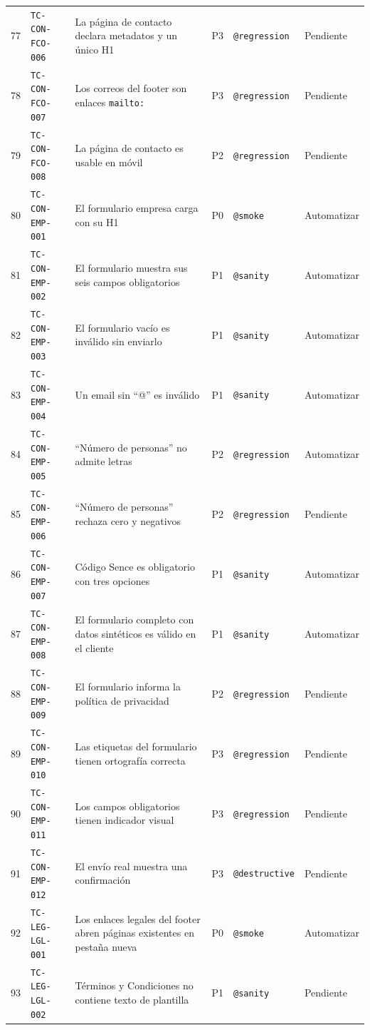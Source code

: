\documentclass[11pt,a4paper]{article}
\newcommand{\tcid}[1]{\texttt{#1}}
\begin{document}
{\begin{xltabular}{\textwidth}{@{}r l X c l l@{}}
77 & \tcid{TC-CON-FCO-006} & La página de contacto declara metadatos y un único H1 & P3 & \texttt{@regression} & Pendiente \\
78 & \tcid{TC-CON-FCO-007} & Los correos del footer son enlaces \texttt{mailto:} & P3 & \texttt{@regression} & Pendiente \\
79 & \tcid{TC-CON-FCO-008} & La página de contacto es usable en móvil & P2 & \texttt{@regression} & Pendiente \\
80 & \tcid{TC-CON-EMP-001} & El formulario empresa carga con su H1 & P0 & \texttt{@smoke} & Automatizar \\
81 & \tcid{TC-CON-EMP-002} & El formulario muestra sus seis campos obligatorios & P1 & \texttt{@sanity} & Automatizar \\
82 & \tcid{TC-CON-EMP-003} & El formulario vacío es inválido sin enviarlo & P1 & \texttt{@sanity} & Automatizar \\
83 & \tcid{TC-CON-EMP-004} & Un email sin ``@'' es inválido & P1 & \texttt{@sanity} & Automatizar \\
84 & \tcid{TC-CON-EMP-005} & ``Número de personas'' no admite letras & P2 & \texttt{@regression} & Automatizar \\
85 & \tcid{TC-CON-EMP-006} & ``Número de personas'' rechaza cero y negativos & P2 & \texttt{@regression} & Pendiente \\
86 & \tcid{TC-CON-EMP-007} & Código Sence es obligatorio con tres opciones & P1 & \texttt{@sanity} & Automatizar \\
87 & \tcid{TC-CON-EMP-008} & El formulario completo con datos sintéticos es válido en el cliente & P1 & \texttt{@sanity} & Automatizar \\
88 & \tcid{TC-CON-EMP-009} & El formulario informa la política de privacidad & P2 & \texttt{@regression} & Pendiente \\
89 & \tcid{TC-CON-EMP-010} & Las etiquetas del formulario tienen ortografía correcta & P3 & \texttt{@regression} & Pendiente \\
90 & \tcid{TC-CON-EMP-011} & Los campos obligatorios tienen indicador visual & P3 & \texttt{@regression} & Pendiente \\
91 & \tcid{TC-CON-EMP-012} & El envío real muestra una confirmación & P3 & \texttt{@destructive} & Pendiente \\
92 & \tcid{TC-LEG-LGL-001} & Los enlaces legales del footer abren páginas existentes en pestaña nueva & P0 & \texttt{@smoke} & Automatizar \\
93 & \tcid{TC-LEG-LGL-002} & Términos y Condiciones no contiene texto de plantilla & P1 & \texttt{@sanity} & Pendiente \\

\end{xltabular}}
\end{document}

